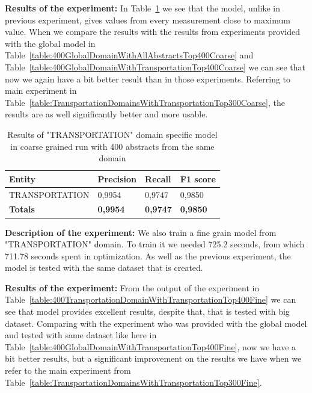 \documentclass[thesis=M,english]{FITthesis}[2018/05/30]
\begin{document}
\textbf{Results of the experiment:} In Table~\ref{table:400TransportationDomainWithTransportationTop400Coarse} we see that the model, unlike in previous experiment, gives values from every measurement close to maximum value. When we compare the results with the results from experiments provided with the global model in Table~\ref{table:400GlobalDomainWithAllAbstractsTop400Coarse} and Table~\ref{table:400GlobalDomainWithTransportationTop400Coarse} we can see that now we again have a bit better result than in those experiments. Referring to main experiment in Table~\ref{table:TransportationDomainsWithTransportationTop300Coarse}, the results are as well significantly better and more usable.

	\begin{table}[H]\centering
		\begin{tabular}{|l|l|l|l|}
			\hline {\textbf{Entity}} & {\textbf{Precision}} & {\textbf{Recall}} & {\textbf{F1 score}}\\\hline
				TRANSPORTATION & 0,9954 & 0,9747 & 0,9850\\\hline
				\textbf{Totals} & \textbf{0,9954} & \textbf{0,9747} & \textbf{0,9850}\\\hline
		\end{tabular}
		\caption{Results of "TRANSPORTATION" domain specific model in coarse grained run with 400 abstracts from the same domain \label{table:400TransportationDomainWithTransportationTop400Coarse}}
	\end{table}
	
\textbf{Description of the experiment:} We also train a fine grain model from "TRANSPORTATION" domain. To train it we needed 725.2 seconds, from which 711.78 seconds spent in optimization. As well as the previous experiment, the model is tested with the same dataset that is created.

\textbf{Results of the experiment:}	From the output of the experiment in Table~\ref{table:400TransportationDomainWithTransportationTop400Fine} we can see that model provides excellent results, despite that, that is tested with big dataset. Comparing with the experiment who was provided with the global model and tested with same dataset like here in Table~\ref{table:400GlobalDomainWithTransportationTop400Fine}, now we have a bit better results, but a significant improvement on the results we have when we refer to the main experiment from Table~\ref{table:TransportationDomainsWithTransportationTop300Fine}.	
	
\end{document}
